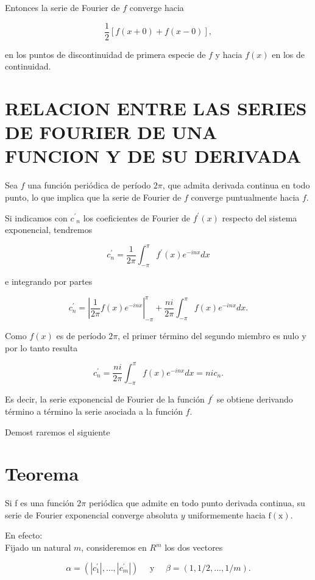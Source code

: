 \documentclass[10pt]{article}
\theoremstyle{plain}
\theoremstyle{definition}
\theoremstyle{remark}
\begin{document}
Entonces la serie de Fourier de $f$ converge hacia

$$
\frac{1}{2}[f(x+0)+f(x-0)],
$$

en los puntos de discontinuidad de primera especie de $f$ y hacia $f(x)$ en los de continuidad.

\section*{RELACION ENTRE LAS SERIES DE FOURIER DE UNA FUNCION Y DE SU DERIVADA}
Sea $f$ una función periódica de período $2 \pi$, que admita derivada continua en todo punto, lo que implica que la serie de Fourier de $f$ converge puntualmente hacia $f$.

Si indicamos con $c^{\prime}{ }_{n}$ los coeficientes de Fourier de $f^{\prime}(x)$ respecto del sistema exponencial, tendremos

$$
c_{n}^{\prime}=\frac{1}{2 \pi} \int_{-\pi}^{\pi} f^{\prime}(x) e^{-i n x} d x
$$

e integrando por partes

$$
c_{n}^{\prime}=\left|\frac{1}{2 \pi} f(x) e^{-i n x}\right|_{-\pi}^{\pi}+\frac{n i}{2 \pi} \int_{-\pi}^{\pi} f(x) e^{-i n x} d x .
$$

Como $f(x)$ es de período $2 \pi$, el primer término del segundo miembro es nulo y por lo tanto resulta


\begin{equation*}
c_{n}^{\prime}=\frac{n i}{2 \pi} \int_{-\pi}^{\pi} f(x) e^{-i n x} d x=n i c_{n} . \tag{5-22}
\end{equation*}


Es decir, la serie exponencial de Fourier de la función $f^{\prime}$ se obtiene derivando término a término la serie asociada a la función $f$.

Demost raremos el siguiente

\section*{Teorema}
Si f es una función $2 \pi$ periódica que admite en todo punto derivada continua, su serie de Fourier exponencial converge absoluta $y$ uniformemente hacia $\mathrm{f}(\mathrm{x})$.

En efecto:\\
Fijado un natural $m$, consideremos en $R^{m}$ los dos vectores

$$
\alpha=\left(\left|c_{1}^{\prime}\right|, \ldots,\left|c_{m}^{\prime}\right|\right) \quad \text { y } \quad \beta=(1,1 / 2, \ldots, 1 / m) .
$$
\end{document}
